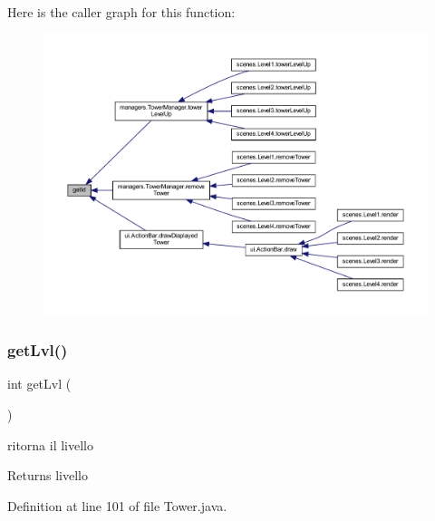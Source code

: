 Here is the caller graph for this function\+:\nopagebreak
\begin{figure}[H]
\begin{center}
\leavevmode
\includegraphics[width=350pt]{classtowers_1_1_tower_a67283be3f45257d1e0c474c563ebb6b6_icgraph}
\end{center}
\end{figure}
\mbox{\label{classtowers_1_1_tower_a69ffaa5d69141ba9aed07daf94b18540}} 
\subsubsection{\texorpdfstring{get\+Lvl()}{getLvl()}}
{\footnotesize\ttfamily int get\+Lvl (\begin{DoxyParamCaption}{ }\end{DoxyParamCaption})}



ritorna il livello 

\begin{DoxyReturn}{Returns}
livello 
\end{DoxyReturn}


Definition at line 101 of file Tower.\+java.

